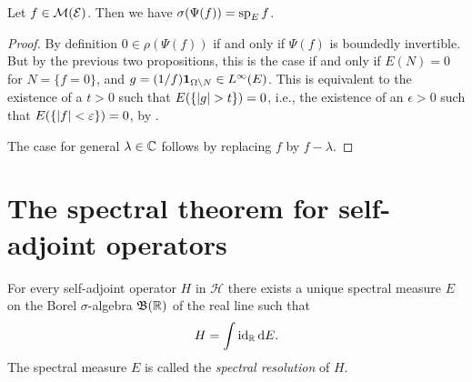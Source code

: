 \documentclass[article, a4paper, 11pt, oneside]{memoir}
\makeatletter
\numberwithin{equation}{chapter}
\newcommand{\calH}{\mathcal{H}}
\newcommand{\calE}{\mathcal{E}}
\newcommand{\dom}{\mathcal{D}}
\theoremstyle{myexample}
\newtheorem{remark}[theorem]{\protect\@remark}
\theoremstyle{myexample}
\theoremstyle{myexamplebreak}
\theoremstyle{myexamplebreak}
\theoremstyle{nonumberplain}
\newtheorem{proof}{\protect\@proof}
\theoremstyle{MyNonumberplain}
\newcommand{\@remark}{}
\newcommand{\@proof}{}
\renewcommand{\@remark}{Remark}%
\renewcommand{\@proof}{Proof}%
\renewcommand{\@remark}{Bemærkning}%
\renewcommand{\@proof}{Bevis}%
\makeatother
\begin{document}
\begin{proposition}
    \label{thm:Psi(f)_spectrum}
    Let $f \in \measurable(\calE)$. Then we have $\sigma(\Psi(f)) = \operatorname{sp}_E f$.
\end{proposition}

\begin{proof}
    By definition $0 \in \rho(\Psi(f))$ if and only if $\Psi(f)$ is boundedly invertible. But by the previous two propositions, this is the case if and only if $E(N) = 0$ for $N = \{f = 0\}$, and $g = (1/f)\mathbf{1}_{\Omega \setminus N} \in L^\infty(E)$. This is equivalent to the existence of a $t > 0$ such that $E(\{ \lvert g\rvert > t \}) = 0$, i.e., the existence of an $\epsilon > 0$ such that $E(\{ \lvert f\rvert < \varepsilon \}) = 0$, by \textcite[Lemma~3.45]{skibsted2019}.
    
    The case for general $\lambda \in \mathbb{C}$ follows by replacing $f$ by $f - \lambda$.
\end{proof}


    









\section{The spectral theorem for self-adjoint operators}

\begin{theorem}
    \label{thm:spectral_theorem_unbounded}
    For every self-adjoint operator $H$ in $\calH$ there exists a unique spectral measure $E$ on the Borel $\sigma$-algebra $\mathfrak{B}(\mathbb{R})$ of the real line such that
    \begin{equation*}
        H = \int \operatorname{id}_{\mathbb{R}} \mathop{}\!\mathrm{d} E.
    \end{equation*}
    The spectral measure $E$ is called the \emph{spectral resolution} of $H$.
\end{theorem}
\end{document}
